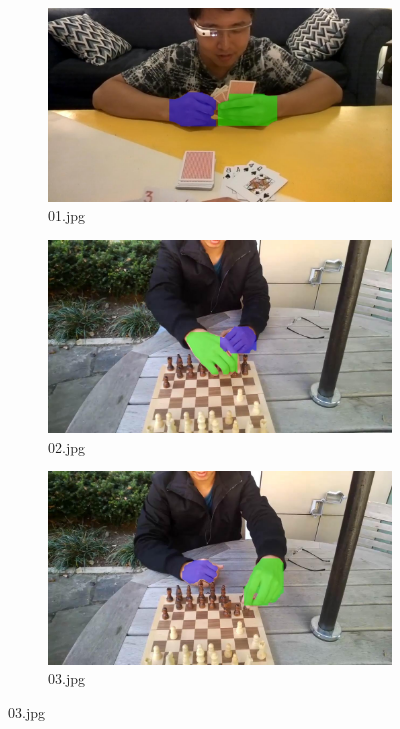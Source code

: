 \begin{figure}[!h]
    \centering
    \begin{subfigure}[b]{0.3 \textwidth}
        \centering
        \includegraphics[width=\textwidth]{images/handSegmentation/01.jpg}
        \caption{01.jpg}
        
    \end{subfigure}
    \hfill
    \begin{subfigure}[b]{0.3\textwidth}
        \centering
        \includegraphics[width=\textwidth]{images/handSegmentation/02.jpg}
        \caption{02.jpg}
       
    \end{subfigure}
    \hfill
    \begin{subfigure}[b]{0.3\textwidth}
        \centering
        \includegraphics[width=\textwidth]{images/handSegmentation/03.jpg}
        \caption{03.jpg}
       

\end{subfigure}
\end{figure}
